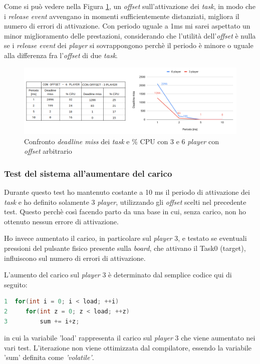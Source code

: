 \documentclass{article}
\begin{document}
Come si può vedere nella Figura \ref{noC-siO}, un \textit{offset} sull'attivazione dei \textit{task}, in modo che i \textit{release event} avvengano in momenti sufficientemente distanziati, migliora il numero di errori di attivazione. Con periodo uguale a 1ms mi sarei aspettato un minor miglioramento delle prestazioni, considerando che l'utilità dell'\textit{offset} è nulla se i \textit{release event} dei \textit{player} si sovrappongono perchè il periodo è minore o uguale alla differenza fra l'\textit{offset} di due \textit{task}.
\begin{figure}[H]
	\centering
	\includegraphics[width=6in]{image/NO_CARICO-OFFSET.png}
	\caption{Confronto \textit{deadline miss} dei \textit{task} e \% CPU con 3 e 6 \textit{player} con \textit{offset} arbitrario}
	\label{noC-siO}
\end{figure}

\subsubsection{Test del sistema all'aumentare del carico}
Durante questo test ho mantenuto costante a 10 ms il periodo di attivazione dei \textit{task} e ho definito solamente 3 \textit{player}, utilizzando gli \textit{offset} scelti nel precedente test. Questo perchè così facendo parto da una base in cui, senza carico, non ho ottenuto nessun errore di attivazione.

Ho invece aumentato il carico, in particolare sul \textit{player} 3, e testato se eventuali pressioni del pulsante fisico presente sulla \textit{board}, che attivano il Task0 (target), influiscono sul numero di errori di attivazione.

L'aumento del carico sul \textit{player} 3 è determinato dal semplice codice qui di seguito:
\begin{lstlisting}[language=C]
1  for(int i = 0; i < load; ++i)
2	  for(int z = 0; z < load; ++z)
3		  sum += i+z;
\end{lstlisting}
in cui la variabile 'load' rappresenta il carico sul \textit{player} 3 che viene aumentato nei vari test.
L'iterazione non viene ottimizzata dal compilatore, essendo la variabile 'sum' definita come \textit{'volatile'}.
\end{document}
